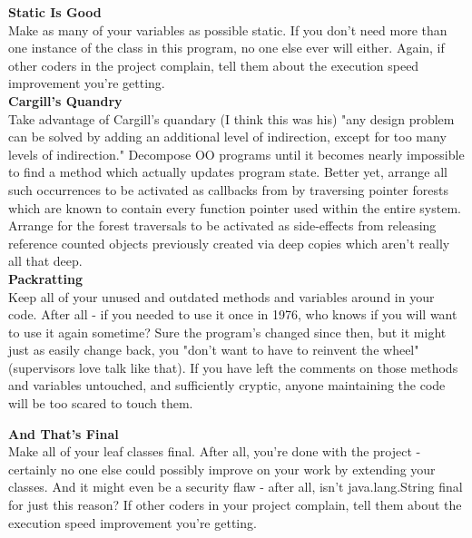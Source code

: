 \documentclass[11pt,twoside,a4paper]{article}
\begin{document}
\textbf{Static Is Good}~\\
Make as many of your variables as possible static. If you don't need more than one instance of the class in this program, no one else ever will either. Again, if other coders in the project complain, tell them about the execution speed improvement you're getting.~\\ 

\textbf{Cargill's Quandry}~\\
Take advantage of Cargill's quandary (I think this was his) "any design problem can be solved by adding an additional level of indirection, except for too many levels of indirection." Decompose OO programs until it becomes nearly impossible to find a method which actually updates program state. Better yet, arrange all such occurrences to be activated as callbacks from by traversing pointer forests which are known to contain every function pointer used within the entire system. Arrange for the forest traversals to be activated as side-effects from releasing reference counted objects previously created via deep copies which aren't really all that deep.~\\ 

\textbf{Packratting}~\\
Keep all of your unused and outdated methods and variables around in your code. After all - if you needed to use it once in 1976, who knows if you will want to use it again sometime? Sure the program's changed since then, but it might just as easily change back, you "don't want to have to reinvent the wheel" (supervisors love talk like that). If you have left the comments on those methods and variables untouched, and sufficiently cryptic, anyone maintaining the code will be too scared to touch them.~\\ 

\clearpage

\textbf{And That's Final}~\\
Make all of your leaf classes final. After all, you're done with the project - certainly no one else could possibly improve on your work by extending your classes. And it might even be a security flaw - after all, isn't java.lang.String final for just this reason? If other coders in your project complain, tell them about the execution speed improvement you're getting.~\\ 
\end{document}
